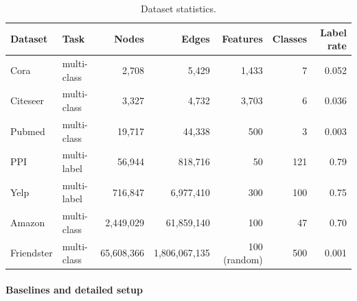 \documentclass[UTF8]{article} %
\begin{document}
\begin{table}[ht]
\vspace{-4mm}
\begin{center}\small
\caption{Dataset statistics.}
\label{dataset-table}
\begin{tabular}{llrrrrr}
\toprule
Dataset & Task & Nodes & Edges & Features & Classes &  Label rate \\
\midrule
Cora & multi-class & 2,708 & 5,429      & 1,433         & 7 & 0.052            \\
Citeseer    & multi-class& 3,327       & 4,732       & 3,703   & 6 & 0.036     \\
Pubmed      & multi-class& 19,717      & 44,338      & 500       & 3  & 0.003  \\
PPI         & multi-label& 56,944      & 818,716     & 50    & 121 & 0.79      \\
Yelp        & multi-label& 716,847     & 6,977,410   & 300  & 100 & 0.75       \\
Amazon      & multi-class& 2,449,029   & 61,859,140  & 100  & 47 & 0.70        \\
Friendster  & multi-class& 65,608,366 & 1,806,067,135 & 100 (random) & 500 & 0.001  \\
\bottomrule    
\end{tabular}
\end{center}
\vspace{-4mm}
\end{table}

\paragraph{Baselines and detailed setup}
~\\
~\\
~\\
\end{document}
